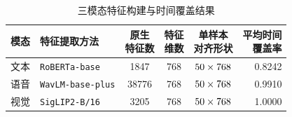\begin{table}[htbp]
\centering{}
\caption{三模态特征构建与时间覆盖结果}
\label{tab:q1_feature_scheme}
\begin{tabularx}{\textwidth}{@{}lXcccr@{}}
\toprule
模态 & 特征提取方法 & \shortstack{原生\\特征数} & \shortstack{特征\\维数} & \shortstack{单样本\\对齐形状} & \shortstack{平均时间\\覆盖率} \\
\midrule
文本 & \texttt{RoBERTa-base} & 1847 & 768 & $50\times768$ & 0.8242 \\
语音 & \texttt{WavLM-base-plus} & 38776 & 768 & $50\times768$ & 0.9910 \\
视觉 & \texttt{SigLIP2-B/16} & 3205 & 768 & $50\times768$ & 1.0000 \\
\bottomrule
\end{tabularx}
\end{table}
